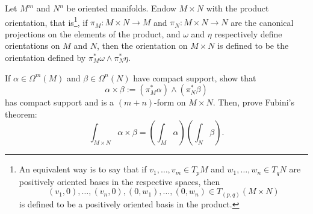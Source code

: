 \begin{exercise}\label{exe:fubini}
  Let $M^m$ and $N^n$ be oriented manifolds. Endow $M\times N$ with the product orientation, that is\footnote{An equivalent way is to say that if $v_1,\ldots,v_m\in T_pM$ and $w_1, \ldots, w_n\in T_q N$ are positively oriented bases in the respective spaces, then \begin{equation}
    (v_1,0),\ldots,(v_n,0),(0,w_1), \ldots, (0,w_n)\in T_{(p,q)}(M\times N)
  \end{equation}is defined to be a positively oriented basis in the product.}, if $\pi_M : M\times N \to M$ and $\pi_N: M\times N \to N$ are the canonical projections on the elements of the product, and $\omega$ and $\eta$ respectively define orientations on $M$ and $N$, then the orientation on $M\times N$ is defined to be the orientation defined by $\pi_M^* \omega \wedge \pi_N^* \eta$.

  If $\alpha\in\Omega^m(M)$ and $\beta\in\Omega^n(N)$ have compact support, show that
  \begin{equation}
    \alpha\times\beta := (\pi_M^*\alpha)\wedge(\pi_N^*\beta)
  \end{equation}
  has compact support and is a $(m+n)$-form on $M\times N$.
  Then, prove Fubini's theorem:
  \begin{equation}
    \int_{M\times N}\alpha\times\beta = \left(\int_M\alpha\right)\left(\int_N\beta\right).
  \end{equation}
\end{exercise}

